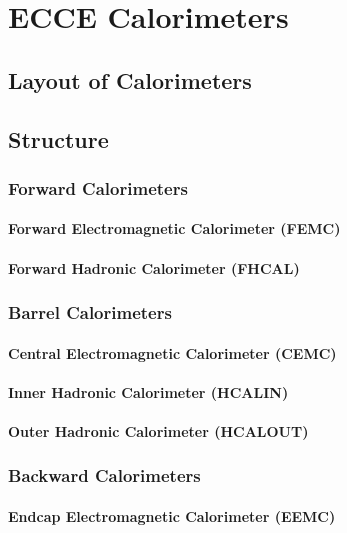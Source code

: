 \chapter{ECCE Calorimeters}
\section{Layout of Calorimeters}
\section{Structure}
\subsection{Forward Calorimeters}
\subsubsection{Forward Electromagnetic Calorimeter (FEMC)}
\subsubsection{Forward Hadronic Calorimeter (FHCAL)}
\subsection{Barrel Calorimeters}
\subsubsection{Central Electromagnetic Calorimeter (CEMC)}
\subsubsection{Inner Hadronic Calorimeter (HCALIN)}
\subsubsection{Outer Hadronic Calorimeter (HCALOUT)}
\subsection{Backward Calorimeters}
\subsubsection{Endcap Electromagnetic Calorimeter (EEMC)}
